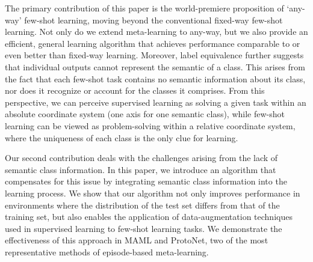 \documentclass[letterpaper]{article} %
\newcommand{\nj}[1]{\textcolor{red}{#1}}
\newcommand{\jh}[1]{\textcolor{blue}{#1}}
\newcommand{\yr}[1]{\textcolor{magenta}{#1}}
\begin{document}
The primary contribution of this paper is the world-premiere proposition of 
`any-way' few-shot learning, moving beyond the conventional fixed-way few-shot learning. Not only do we extend meta-learning to any-way, but we also provide an efficient, general learning algorithm that achieves performance comparable to or even better %
than fixed-way learning. Moreover, label equivalence further suggests that individual outputs cannot represent the semantic of a class. This arises from the fact that each few-shot task %
contains no semantic information about its class, nor does it recognize or account for the classes it comprises. From this perspective, we can perceive supervised learning as solving a given task within an absolute coordinate system (one axis for one semantic class), while few-shot learning can be viewed as problem-solving within a relative coordinate system, where the uniqueness of each class is the only clue for learning. %

Our second contribution deals with the challenges arising from the lack of semantic class information. In this paper, we introduce an algorithm that compensates for this issue by integrating semantic class information into the learning process. We show that our algorithm not only improves performance in environments where the distribution of the test set differs from that of the training set, but also enables the application of data-augmentation techniques used in supervised learning to few-shot learning tasks. We demonstrate the effectiveness of this approach in MAML and ProtoNet, two of the most representative methods of episode-based meta-learning.

\end{document}
